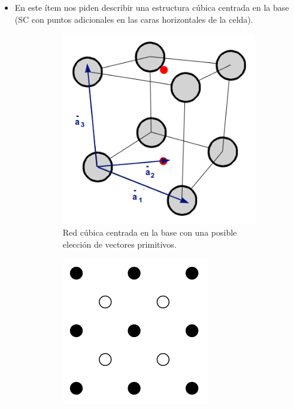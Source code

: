 \documentclass[a4paper]{article}
\begin{document}
\begin{itemize}
\item En este \'item nos piden describir una estructura c\'ubica centrada en la base (SC con puntos adicionales en las caras horizontales de la celda).

\begin{figure}[H]
  \centering
  \begin{subfigure}[b]{0.4\linewidth}
    \includegraphics[width=\linewidth]{cubo3d_ej1.png}
     \caption{Red c\'ubica centrada en la base con una posible elecci\'on de vectores primitivos.}
  \end{subfigure}
  \begin{subfigure}[b]{0.4\linewidth}
    \includegraphics[width=\linewidth]{red_cubica.png}

\end{subfigure}
\end{figure}
\end{itemize}
\end{document}
